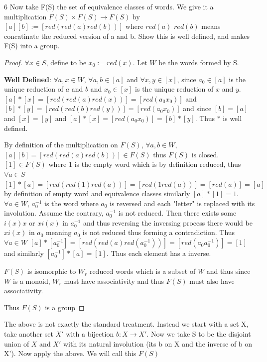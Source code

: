 \documentclass{article}
\begin{document}
\bigskip

\begin{PROB}{6}\label{Problem 6.}
    Now take F(S) the set of equivalence classes of words. We give it a multiplication $F(S) \times F(S) \to F(S)$ by  $[a][b]  := [red(red(a)red(b))]$ where  $red(a)$ $red(b)$ means concatinate the reduced version of a and b. Show this is well defined, and makes F(S) into a group.  
\end{PROB}
\begin{proof}
    $\forall x \in S$, define to be $x_0 := red(x)$. Let $W$ be the words formed by S.

    \textbf{Well Defined}: $\forall a, x \in W$, $\forall a, b \in [a]$ and $\forall x, y \in [x]$, since $a_0 \in [a]$ is the unique reduction of $a$ and $b$ and $x_0 \in [x]$ is the unique reduction of $x$ and $y$. $[a] \ast [x] = [red(red(a)red(x))] = [red(a_0x_0)]$ and $[b] \ast [y] = [red(red(b)red(y))] = [red(a_0x_0)]$ and since $[b] = [a]$ and $[x] = [y]$ and $[a] \ast [x] = [red(a_0x_0)] = [b] \ast [y]$. Thus $\ast$ is well defined. 

    By definition of the multiplication on $F(S)$, $\forall a, b \in W$, $[a][b]  = [red(red(a)red(b))] \in F(S)$ thus $F(S)$ is closed. $[1] \in F(S)$ where 1 is the empty word which is by definition reduced, thus $\forall a \in S$ $[1] \ast [a] = [red(red(1)red(a))] = [red(1red(a))] = [red(a)] = [a]$ by definition of empty word and equivalence classes similarly $[a] \ast [1] = 1$. $\forall a \in W$, $a_0^{-1}$ is the word where $a_0$ is reversed and each "letter" is replaced with its involution. Assume the contrary, $a_0^{-1}$ is not reduced. Then there exists some $i(x) x$ or $x i(x)$ in $a_0^{-1}$ and thus reversing the inversing process there would be $x i(x)$ in $a_0$ meaning $a_0$ is not reduced thus forming a contradiction. Thus $\forall a\in W$ $[a] \ast [a_0^{-1}] = [red(red(a)red(a_0^{-1}))] = [red(a_0a_0^{-1})] = [1]$ and similarly $[a_0^{-1}] \ast [a] = [1]$. Thus each element has a inverse.

    $F(S)$ is isomorphic to $W_r$ reduced words which is a subset of $W$ and thus since $W$ is a monoid, $W_r$ must have associativity and thus $F(S)$ must also have associativity.

    Thus $F(S)$ is a group
\end{proof}

\bigskip

The above is not exactly the standard treatment. Instead we start with a set X, take another set $X'$ with a bijection  $b: X\to X'$. Now we take S to be the disjoint union  of $X$ and $X'$ with its natural involution (its b on X and the inverse of b on X'). Now apply the above. We will call this $F(S)$ 
\end{document}
